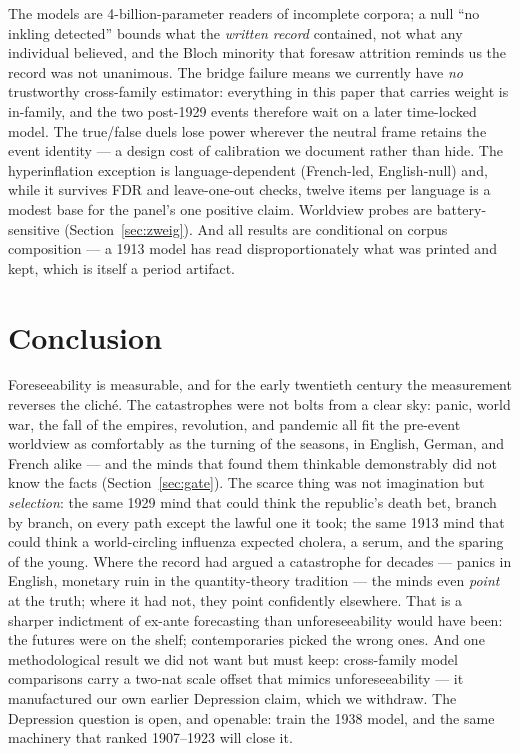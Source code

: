 \documentclass[11pt]{article}
\begin{document}
The models are 4-billion-parameter readers of incomplete corpora; a null ``no inkling detected'' bounds
what the \emph{written record} contained, not what any individual believed, and the Bloch minority that
foresaw attrition reminds us the record was not unanimous. The bridge failure means we currently have
\emph{no} trustworthy cross-family estimator: everything in this paper that carries weight is in-family,
and the two post-1929 events therefore wait on a later time-locked model. The true/false duels lose power
wherever the neutral frame retains the event identity --- a design cost of calibration we document rather
than hide. The hyperinflation exception is language-dependent (French-led, English-null) and, while it
survives FDR and leave-one-out checks, twelve items per language is a modest base for the panel's one
positive claim. Worldview probes are battery-sensitive (Section~\ref{sec:zweig}). And all results are
conditional on corpus composition --- a 1913 model has read disproportionately what was printed and kept,
which is itself a period artifact.

\section{Conclusion}

Foreseeability is measurable, and for the early twentieth century the measurement reverses the cliché. The
catastrophes were not bolts from a clear sky: panic, world war, the fall of the empires, revolution, and
pandemic all fit the pre-event worldview as comfortably as the turning of the seasons, in English, German,
and French alike --- and the minds that found them thinkable demonstrably did not know the facts
(Section~\ref{sec:gate}). The scarce thing was not imagination but \emph{selection}: the same 1929 mind
that could think the republic's death bet, branch by branch, on every path except the lawful one it took;
the same 1913 mind that could think a world-circling influenza expected cholera, a serum, and the sparing
of the young. Where the record had argued a catastrophe for decades --- panics in English, monetary ruin in
the quantity-theory tradition --- the minds even \emph{point} at the truth; where it had not, they point
confidently elsewhere. That is a sharper indictment of ex-ante forecasting than unforeseeability would have
been: the futures were on the shelf; contemporaries picked the wrong ones. And one methodological result we
did not want but must keep: cross-family model comparisons carry a two-nat scale offset that mimics
unforeseeability --- it manufactured our own earlier Depression claim, which we withdraw. The Depression
question is open, and openable: train the 1938 model, and the same machinery that ranked 1907--1923 will
close it.
\end{document}
